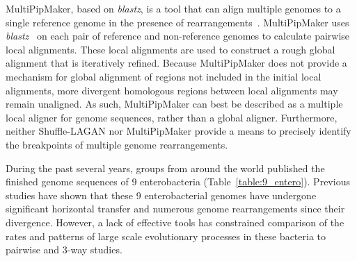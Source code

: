 \documentclass[titlepage,11pt]{article}
\begin{document}
MultiPipMaker, based on \textit{blastz}, is a tool that can align multiple genomes
to a single reference genome in the presence of rearrangements~\citep{multipipmaker}.  
MultiPipMaker uses \textit{blastz}~\citep{blastz} on each pair of reference and
non-reference genomes to calculate pairwise local alignments.  These local
alignments are used to construct a rough global alignment that is iteratively
refined.  Because MultiPipMaker does not provide a mechanism for global alignment of
regions not included in the initial local alignments, more divergent homologous
regions between local alignments may remain unaligned.  As such, MultiPipMaker
can best be described as a multiple local aligner for genome sequences, rather
than a global aligner. 
Furthermore, neither
Shuffle-LAGAN nor MultiPipMaker provide a means to precisely identify the
breakpoints of multiple genome rearrangements.


During the past several years, groups from around the world published the
finished genome sequences of 9 enterobacteria
(Table~\ref{table:9_entero}).  Previous studies have shown that these 9
enterobacterial genomes have undergone significant horizontal transfer and
numerous genome rearrangements since their divergence.  However,
a lack of effective tools has constrained comparison of the rates and patterns
of large scale evolutionary processes in these bacteria to pairwise and 3-way
studies.

\end{document}
